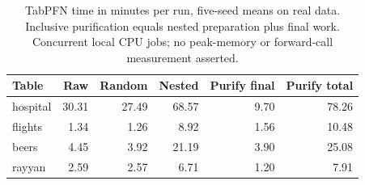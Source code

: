 \begin{table}[t]
\centering\small
\setlength{\tabcolsep}{3.5pt}
\caption{TabPFN time in minutes per run, five-seed means on real data. Inclusive purification equals nested preparation plus final work. Concurrent local CPU jobs; no peak-memory or forward-call measurement asserted.}
\label{tab:cost}
\begin{tabular}{lrrrrr}
\toprule
Table & Raw & Random & Nested & Purify final & Purify total \\
\midrule
hospital & 30.31 & 27.49 & 68.57 & 9.70 & 78.26 \\
flights & 1.34 & 1.26 & 8.92 & 1.56 & 10.48 \\
beers & 4.45 & 3.92 & 21.19 & 3.90 & 25.08 \\
rayyan & 2.59 & 2.57 & 6.71 & 1.20 & 7.91 \\
\bottomrule
\end{tabular}
\end{table}
